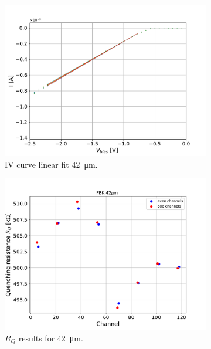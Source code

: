 \begin{figure}[htbp]
\begin{subfigure}{0.48\textwidth}
    \includegraphics[width=\textwidth]{gfx/plots/Rq/42/FBK_42um_IV.pdf}
    \caption{IV curve linear fit \SI{42}{\micro m}.}
    \label{fig:}
  \end{subfigure}
  \hfill
  \begin{subfigure}{0.48\textwidth}
    \includegraphics[width=\textwidth]{gfx/plots/Rq/42/FBK_42um_RQs.pdf}
    \caption{$R_Q$ results for \SI{42}{\micro m}.}
    \label{fig:}
  \end{subfigure}
  \begin{subfigure}{0.48\textwidth}

\end{subfigure}
\end{figure}
